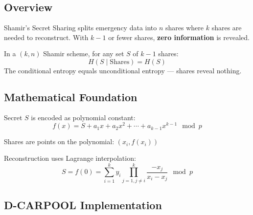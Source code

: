 \subsection{Overview}

Shamir's Secret Sharing splits emergency data into $n$ shares where $k$ shares are needed to reconstruct. With $k-1$ or fewer shares, \textbf{zero information} is revealed.

\begin{theorem}
In a $(k,n)$ Shamir scheme, for any set $S$ of $k-1$ shares:
\begin{equation}
H(S \mid \text{Shares}) = H(S)
\end{equation}
The conditional entropy equals unconditional entropy — shares reveal nothing.
\end{theorem}

\subsection{Mathematical Foundation}

Secret $S$ is encoded as polynomial constant:
\begin{equation}
f(x) = S + a_1x + a_2x^2 + \cdots + a_{k-1}x^{k-1} \mod p
\end{equation}

Shares are points on the polynomial: $(x_i, f(x_i))$

Reconstruction uses Lagrange interpolation:
\begin{equation}
S = f(0) = \sum_{i=1}^{k} y_i \prod_{j=1, j \neq i}^{k} \frac{-x_j}{x_i - x_j} \mod p
\end{equation}

\subsection{D-CARPOOL Implementation}

